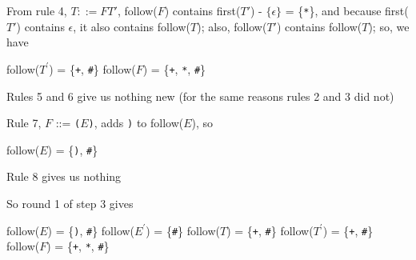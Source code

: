 \documentclass[8pt,a4paper,compress]{beamer}
\newcommand{\mm}[1]{$#1$}
\newcommand{\expo}[2]{$#1^{#2}$}
\newenvironment{spaced}
{
\smallskip
\hspace{.5cm}
\begin{minipage}[c]{\textwidth}
}
{
\end{minipage}
\smallskip
}
\begin{document}
\begin{frame}[fragile]
\pause

From rule 4, $T  ::= F T'$, follow($F$) contains first($T'$) - $\{\epsilon\}$ = \{\lstinline{*}\}, and because first($T'$) contains $\epsilon$, it also contains follow($T$); also, follow($T'$) contains follow($T$); so, we have

\text{ }
\begin{spaced}
\begin{production}
follow(\expo{T}{\prime}) = \{\lstinline{+}, \lstinline{#}\}
follow(\mm{F})  = \{\lstinline{+}, \lstinline{*}, \lstinline{#}\}
\end{production}
\end{spaced}

\pause

Rules 5 and 6 give us nothing new (for the same reasons rules 2 and 3 did not)

\pause
\bigskip

Rule 7, $F$  ::= \lstinline{(}$E$\lstinline{)}, adds \lstinline{)} to follow($E$), so

\text{ }
\begin{spaced}
\begin{production}
follow(\mm{E}) = \{\lstinline{)}, \lstinline{#}\}
\end{production}
\end{spaced}

\pause

Rule 8 gives us nothing

\pause
\bigskip

So round 1 of step 3 gives

\text{ }
\begin{spaced}
\begin{production}
follow(\mm{E})  = \{\lstinline{)}, \lstinline{#}\}
follow(\expo{E}{\prime}) = \{\lstinline{#}\}
follow(\mm{T})  = \{\lstinline{+}, \lstinline{#}\}
follow(\expo{T}{\prime}) = \{\lstinline{+}, \lstinline{#}\}
follow(\mm{F})  = \{\lstinline{+}, \lstinline{*}, \lstinline{#}\}
\end{production}
\end{spaced}
\end{frame}
\end{document}

